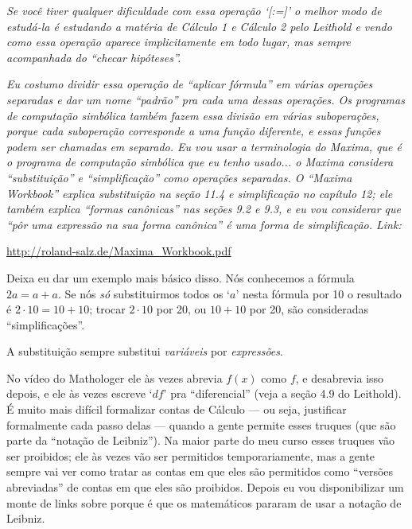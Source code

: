 \documentclass[oneside,12pt]{article}
\begin{document}
\msk

{\sl Se você tiver qualquer dificuldade com essa operação `[:=]' o
  melhor modo de estudá-la é estudando a matéria de Cálculo 1 e
  Cálculo 2 pelo Leithold e vendo como essa operação aparece
  implicitamente em todo lugar, mas sempre acompanhada do ``checar
  hipóteses''.}


{\sl Eu costumo dividir essa operação de ``aplicar fórmula'' em várias
  operações separadas e dar um nome ``padrão'' pra cada uma dessas
  operações. Os programas de computação simbólica também fazem essa
  divisão em várias suboperações, porque cada suboperação corresponde
  a uma função diferente, e essas funções podem ser chamadas em
  separado. Eu vou usar a terminologia do Maxima, que é o programa de
  computação simbólica que eu tenho usado... o Maxima considera
  ``substituição'' e ``simplificação'' como operações separadas. O
  ``Maxima Workbook'' explica substituição na seção 11.4 e
  simplificação no capítulo 12; ele também explica ``formas
  canônicas'' nas seções 9.2 e 9.3, e eu vou considerar que ``pôr uma
  expressão na sua forma canônica'' é uma forma de simplificação.
  Link:}

\url{http://roland-salz.de/Maxima_Workbook.pdf}

\msk

Deixa eu dar um exemplo mais básico disso. Nós conhecemos a fórmula
$2a = a+a$. Se nós {\sl só} substituirmos todos os `$a$' nesta fórmula
por 10 o resultado é $2·10 = 10+10$; trocar $2·10$ por 20, ou $10+10$
por 20, são consideradas ``simplificações''.

A substituição sempre substitui {\sl variáveis} por {\sl expressões}.

\msk


No vídeo do Mathologer ele às vezes abrevia $f(x)$ como $f$, e
desabrevia isso depois, e ele às vezes escreve `$df$' pra
``diferencial'' (veja a seção 4.9 do Leithold). É muito mais difícil
formalizar contas de Cálculo --- ou seja, justificar formalmente cada
passo delas --- quando a gente permite esses truques (que são parte da
``notação de Leibniz''). Na maior parte do meu curso esses truques vão
ser proibidos; ele às vezes vão ser permitidos temporariamente, mas a
gente sempre vai ver como tratar as contas em que eles são permitidos
como ``versões abreviadas'' de contas em que eles são proibidos.
Depois eu vou disponibilizar um monte de links sobre porque é que os
matemáticos pararam de usar a notação de Leibniz.
\end{document}

